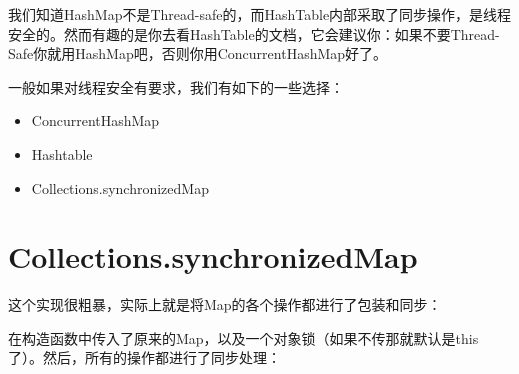 \documentclass[12pt]{article}
\begin{document}
\makeblogtitle

我们知道HashMap不是Thread-safe的，而HashTable内部采取了同步操作，是线程安全的。然而有趣的是你去看HashTable的文档，它会建议你：如果不要Thread-Safe你就用HashMap吧，否则你用ConcurrentHashMap好了。

一般如果对线程安全有要求，我们有如下的一些选择：

\begin{itemize}
\tightlist
\item
  ConcurrentHashMap
\item
  Hashtable
\item
  Collections.synchronizedMap
\end{itemize}

\section{Collections.synchronizedMap}\label{collections.synchronizedmap}

这个实现很粗暴，实际上就是将Map的各个操作都进行了包装和同步：

\begin{Shaded}
\begin{Highlighting}[]
  \OperatorTok{\textless{}}\OperatorTok{,}\OperatorTok{\textgreater{}}
         \OperatorTok{\textless{}}\OperatorTok{,}\OperatorTok{\textgreater{},}  \OperatorTok{\{}
      \OperatorTok{\textless{}}\OperatorTok{,}\OperatorTok{\textgreater{}}\OperatorTok{;}     
     \OperatorTok{;}  

    \OperatorTok{(}\OperatorTok{\textless{}}\OperatorTok{,}\OperatorTok{\textgreater{}}\OperatorTok{)} \OperatorTok{\{}
         \OperatorTok{=}\OperatorTok{(}\OperatorTok{);}
\OperatorTok{=} \OperatorTok{;}
    \OperatorTok{\}}
\end{Highlighting}
\end{Shaded}

在构造函数中传入了原来的Map，以及一个对象锁（如果不传那就默认是this了）。然后，所有的操作都进行了同步处理：
\end{document}
